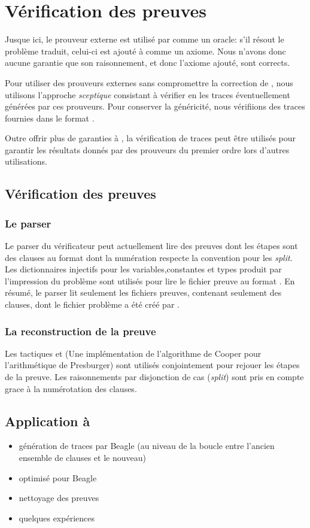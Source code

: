 \section{Vérification des preuves \tff}
\label{sec:traces}

Jusque ici, le prouveur externe est utilisé par \holfour comme un
oracle: s'il résout le problème traduit, celui-ci est ajouté à \holfour
comme un axiome. Nous n'avons donc aucune garantie que son raisonnement,
et donc l'axiome ajouté, sont corrects.

Pour utiliser des prouveurs externes sans compromettre la correction de
\holfour, nous utilisons l'approche \emph{sceptique} consistant à
vérifier en \holfour les traces éventuellement générées par ces
prouveurs. Pour conserver la généricité, nous vérifiions des traces
fournies dans le format \tff.

Outre offrir plus de garanties à \holfour, la vérification de traces
\tff peut être utilisés pour garantir les résultats donnés par des
prouveurs du premier ordre lors d'autres utilisations.


\subsection{Vérification des preuves}

\subsubsection{Le parser}
Le parser du vérificateur peut actuellement lire des preuves dont les étapes sont des clauses au format \tff dont la numération respecte la convention \tff pour les \textit{split}. Les dictionnaires injectifs pour les variables,constantes et types produit par l'impression du problème sont utilisés pour lire le fichier preuve au format \tff. En résumé, le parser lit seulement les fichiers preuves, contenant seulement des clauses, dont le fichier problème a été créé par \holfour.

\subsubsection{La reconstruction de la preuve}
Les tactiques \metistac et \coopertac (Une implémentation de l'algorithme de Cooper pour l'arithmétique de Presburger)
sont utilisés conjointement pour rejouer les étapes de la preuve. 
Les raisonnements par disjonction de cas (\textit{split}) sont pris en compte grace à la numérotation des clauses.


\subsection{Application à \beagle}
\begin{itemize}
\item génération de traces par Beagle (au niveau de la boucle entre
  l'ancien ensemble de clauses et le nouveau)
\item optimisé pour Beagle
\item nettoyage des preuves
\item quelques expériences
\end{itemize}

